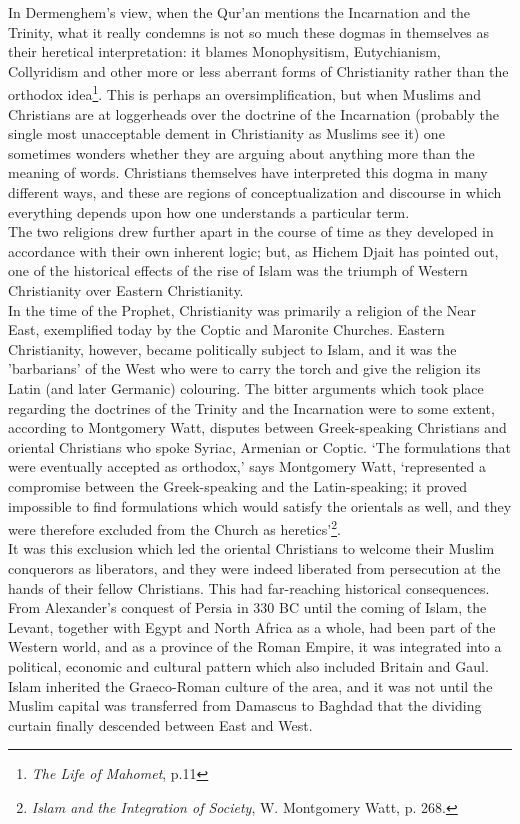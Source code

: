 \documentclass[10pt, twoside]{book}
\begin{document}
In Dermenghem's view, when the Qur'an mentions the Incarnation and the Trinity, what it really 
condemns is not so much these dogmas in themselves as their heretical interpretation: it blames 
Monophysitism, Eutychianism, Collyridism and other more or less aberrant forms of Christianity rather 
than the orthodox idea\footnote{\emph{The Life of Mahomet}, p.11}. This is perhaps an oversimplification, but when Muslims and Christians are at loggerheads over the doctrine of the Incarnation (probably the single most unacceptable dement in Christianity as Muslims see it) one sometimes wonders whether they are arguing about anything more than the meaning of words. Christians themselves have interpreted this dogma in many different ways, and these are regions of conceptualization and discourse in which everything depends upon how one understands a particular term. \\

The two religions drew further apart in the course of time as they developed in accordance with their 
own inherent logic; but, as Hichem Djait has pointed out, one of the historical effects of the rise 
of Islam was the triumph of Western Christianity over Eastern Christianity. \\

In the time of the Prophet, Christianity was primarily a religion of the Near East, exemplified today 
by the Coptic and Maronite Churches. Eastern Christianity, however, became politically subject to 
Islam, and it was the 'barbarians' of the West who were to carry the torch and give the religion its 
Latin (and later Germanic) colouring. The bitter arguments which took place regarding the doctrines 
of the Trinity and the Incarnation were to some extent, according to Montgomery Watt, disputes 
between Greek\hyp{}speaking Christians and oriental Christians who spoke Syriac, Armenian or Coptic. `The formulations that were eventually accepted as orthodox,' says Montgomery Watt, `represented a 
compromise between the Greek\hyp{}speaking and the Latin\hyp{}speaking; it proved impossible to find 
formulations which would satisfy the orientals as well, and they were therefore excluded from the 
Church as heretics'\footnote{\emph{Islam and the Integration of Society}, W. Montgomery Watt, p. 268.}. \\

It was this exclusion which led the oriental Christians to welcome their Muslim conquerors as 
liberators, and they were indeed liberated from persecution at the hands of their fellow Christians. 
This had far\hyp{}reaching historical consequences. From Alexander's conquest of Persia in 330 BC until 
the coming of Islam, the Levant, together with Egypt and North Africa as a whole, had been part of 
the Western world, and as a province of the Roman Empire, it was integrated into a political, 
economic and cultural pattern which also included Britain and Gaul. Islam inherited the Graeco-Roman 
culture of the area, and it was not until the Muslim capital was transferred from Damascus to Baghdad 
that the dividing curtain finally descended between East and West. \\
\end{document}
